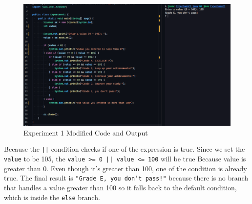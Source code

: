 \documentclass[12pt,titlepage]{article}
\begin{document}
\begin{enumerate}
{        \begin{figure}[h]
            \centering
            \includegraphics[width=\textwidth]{images/experiment1-or.png}
            \caption{Experiment 1 Modified Code and Output}
        \end{figure}

        Because the \texttt{||} condition checks if one of the expression is true.
        Since we set the \texttt{value} to be 105, the \texttt{value >= 0 || value <= 100} will be true Because
        value is greater than 0. Even though it's greater than 100, one of the condition is already true.
        The final result is \texttt{"Grade E, you don't pass!"} because there is no branch that handles a value greater than 100
        so it falls back to the default condition, which is inside the \texttt{else} branch.
    }
\end{enumerate}
\pagebreak
\end{document}
